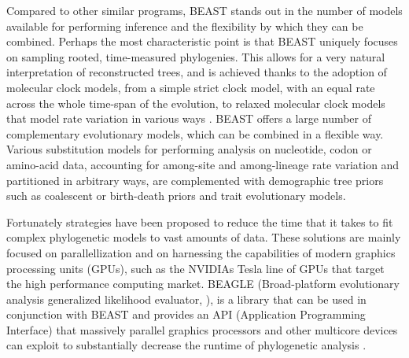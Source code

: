 Compared to other similar programs, BEAST stands out in the number of models available for performing inference and the flexibility by which they can be combined.
Perhaps the most characteristic point is that BEAST uniquely focuses on sampling rooted, time-measured phylogenies.
This allows for a very natural interpretation of reconstructed trees, and is achieved thanks to the adoption of molecular clock models, from a simple strict clock model, with an equal rate across the whole time-span of the evolution, to relaxed molecular clock models that model rate variation in various ways \citep{Thorne1998,Yoder2000,Drummond2006,Drummond2010}.
BEAST offers a large number of complementary evolutionary models, which can be combined in a flexible way.
Various substitution models for performing analysis on nucleotide, codon or amino-acid data, accounting for among-site and among-lineage rate variation and partitioned in arbitrary ways, are complemented with demographic tree priors such as coalescent \citep{Drummond2005,Minin2008b} or birth-death priors \citep{Nowak2006} and trait evolutionary models.


Fortunately strategies have been proposed to reduce the time that it takes to fit complex phylogenetic models to vast amounts of data.
These solutions are mainly focused on parallellization and on harnessing the capabilities of modern graphics processing units (GPUs), such as the NVIDIAs Tesla line of GPUs that target the high performance computing market.
BEAGLE (Broad-platform evolutionary analysis generalized likelihood evaluator, \cite{Ayres2012}), is a library that can be used in conjunction with BEAST and provides an API (Application Programming Interface) that massively parallel graphics processors and other multicore devices can exploit to substantially decrease the runtime of phylogenetic analysis \citep{Suchard2009}.

